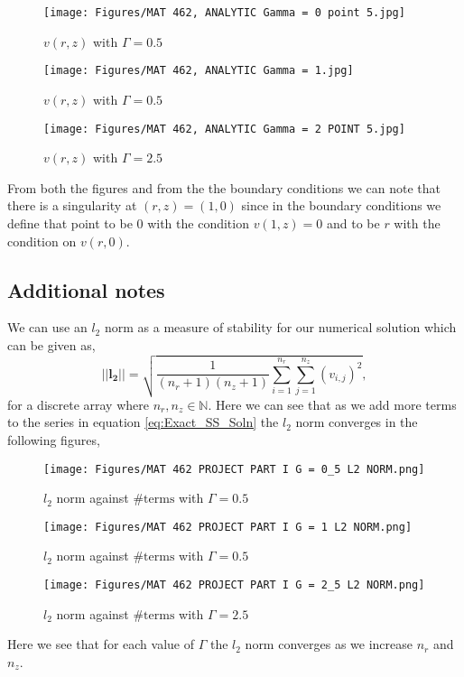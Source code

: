 \documentclass[11pt,letterpaper]{article}
\newcommand{\fpar}[1]{\left({#1}\right)} %
\newcommand{\N}{\mathbb N} %
\begin{document}
\begin{figure}[H]
  \texttt{[image: Figures/MAT 462, ANALYTIC Gamma = 0 point 5.jpg]}
  \caption{$v(r,z)$ with $\Gamma = 0.5 $}\label{fig:Gamma0.5}
\endminipage\hfill
{}
  \texttt{[image: Figures/MAT 462, ANALYTIC Gamma = 1.jpg]}
  \caption{$v(r,z)$ with $\Gamma = 0.5 $}\label{fig:Gamma1}
\endminipage\hfill
{}%
  \texttt{[image: Figures/MAT 462, ANALYTIC Gamma = 2 POINT 5.jpg]}
  \caption{$v(r,z)$ with $\Gamma = 2.5 $}\label{fig:Gamma2.5}
\endminipage
\end{figure}

From both the figures and from the the boundary conditions we can note that there is a singularity at $(r,z) = (1,0)$ since in the boundary conditions we define that point to be 0 with the condition $v(1,z) = 0$ and to be $r$ with the condition on $v(r,0)$. 
\subsection{Additional notes}
We can use an $l_2$ norm as a measure of stability for our numerical solution which can be given as, 
\begin{equation}\label{l2norm}
    ||\mathbf{l_{2}}|| = \sqrt{\dfrac{1}{(n_r+1)(n_z+1)} \sum_{i = 1}^{n_r}\sum_{j = 1}^{n_z}\fpar{v_{i,j}}^2},
\end{equation}
for a discrete array where $n_r,n_z\in\N$. Here we can see that as we add more terms to the series in equation \eqref{eq:Exact_SS_Soln} the $l_2$ norm converges in the following figures,


\begin{figure}[H]
  \texttt{[image: Figures/MAT 462 PROJECT PART I G = 0\_5 L2 NORM.png]}
  \caption{$l_2$ norm against $\# \text{terms} $ with $\Gamma = 0.5 $}\label{fig:Gamma0.5l2}
\endminipage\hfill
{}
  \texttt{[image: Figures/MAT 462 PROJECT PART I G = 1 L2 NORM.png]}
  \caption{$l_2$ norm against $\# \text{terms} $ with $\Gamma = 0.5 $}\label{fig:Gamma1l2}
\endminipage\hfill
{}%
  \texttt{[image: Figures/MAT 462 PROJECT PART I G = 2\_5 L2 NORM.png]}
  \caption{$l_2$ norm against $\# \text{terms} $ with $\Gamma = 2.5 $}\label{fig:Gamma2.5l2}
\endminipage
\end{figure}
Here we see that for each value of $\Gamma$ the $l_2$ norm converges as we increase $n_r$ and $n_z$.  
\end{document}
